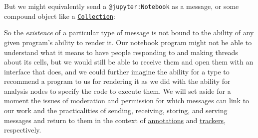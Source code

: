 \begin{Shaded}
\begin{Highlighting}[]
\FunctionTok{\{}
  \FunctionTok{:} \FunctionTok{,}
  \FunctionTok{:} \FunctionTok{,}
  \FunctionTok{:} \FunctionTok{,}
  \FunctionTok{:} 
\FunctionTok{\}}
\end{Highlighting}
\end{Shaded}

But we might equivalently send a \texttt{@jupyter:Notebook} as a
message, or some compound object like a
\href{https://www.w3.org/TR/activitystreams-vocabulary/\#dfn-collection}{\texttt{Collection}}:

\begin{Shaded}
\begin{Highlighting}[]
\FunctionTok{\{}
  \FunctionTok{:} \FunctionTok{,}
  \FunctionTok{:} \FunctionTok{,}
  \FunctionTok{:} \FunctionTok{,}
  \FunctionTok{:} \FunctionTok{,}
  \FunctionTok{:} \OtherTok{[}
    \FunctionTok{\{}
      \FunctionTok{:} \FunctionTok{,}
      \FunctionTok{:} 
    \FunctionTok{\}}
    \FunctionTok{\{}
      \FunctionTok{:} \FunctionTok{,}
      \FunctionTok{:} \FunctionTok{,}
      \FunctionTok{:} 
    \FunctionTok{\}}\OtherTok{,}
  \OtherTok{]}
\FunctionTok{\}}
\end{Highlighting}
\end{Shaded}

So the \emph{existence} of a particular type of message is not bound to
the ability of any given program's ability to render it. Our notebook
program might not be able to understand what it means to have people
responding to and making threads about its cells, but we would still be
able to receive them and open them with an interface that does, and we
could further imagine the ability for a type to recommend a program to
us for rendering it as we did with the ability for analysis nodes to
specify the code to execute them. We will set aside for a moment the
issues of moderation and permission for which messages can link to our
work and the practicalities of sending, receiving, storing, and serving
messages and return to them in the context of
\protect\hyperlink{overlays--adversarial-interoperability}{annotations}
and \protect\hyperlink{trackers-clients--wikis}{trackers}, respectively.

